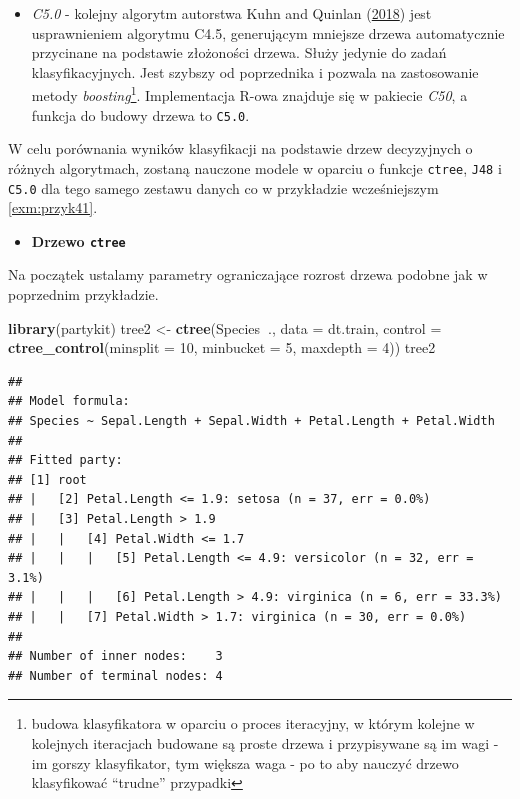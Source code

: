 \documentclass[]{book}
\newenvironment{Shaded}{\begin{snugshade}}{\end{snugshade}}
\newcommand{\DataTypeTok}[1]{\textcolor[rgb]{0.13,0.29,0.53}{#1}}
\newcommand{\DecValTok}[1]{\textcolor[rgb]{0.00,0.00,0.81}{#1}}
\newcommand{\KeywordTok}[1]{\textcolor[rgb]{0.13,0.29,0.53}{\textbf{#1}}}
\newcommand{\NormalTok}[1]{#1}
\newcommand{\OperatorTok}[1]{\textcolor[rgb]{0.81,0.36,0.00}{\textbf{#1}}}
\newcommand{\StringTok}[1]{\textcolor[rgb]{0.31,0.60,0.02}{#1}}
\providecommand{\tightlist}{%
  \setlength{\itemsep}{0pt}\setlength{\parskip}{0pt}}
\let\rmarkdownfootnote\footnote%
\def\footnote{\protect\rmarkdownfootnote}
\theoremstyle{plain}
\theoremstyle{definition}
\theoremstyle{definition}
\theoremstyle{definition}
\theoremstyle{definition}
\theoremstyle{remark}
\let\BeginKnitrBlock\begin \let\EndKnitrBlock\end
\begin{document}
\begin{itemize}
\item
  \emph{C5.0} - kolejny algorytm autorstwa Kuhn and Quinlan (\protect\hyperlink{ref-R-C50}{2018}) jest usprawnieniem algorytmu C4.5, generującym mniejsze drzewa automatycznie przycinane na podstawie złożoności drzewa. Służy jedynie do zadań klasyfikacyjnych. Jest szybszy od poprzednika i pozwala na zastosowanie metody \emph{boosting}\footnote{budowa klasyfikatora w oparciu o proces iteracyjny, w którym kolejne w kolejnych iteracjach budowane są proste drzewa i przypisywane są im wagi - im gorszy klasyfikator, tym większa waga - po to aby nauczyć drzewo klasyfikować ``trudne'' przypadki}. Implementacja R-owa znajduje się w pakiecie \emph{C50}, a funkcja do budowy drzewa to \texttt{C5.0}.
\end{itemize}

\BeginKnitrBlock{example}
\protect\hypertarget{exm:przyk42}{}{\label{exm:przyk42} }W celu porównania wyników klasyfikacji na podstawie drzew decyzyjnych o różnych algorytmach, zostaną nauczone modele w oparciu o funkcje \texttt{ctree}, \texttt{J48} i \texttt{C5.0} dla tego samego zestawu danych co w przykładzie wcześniejszym \ref{exm:przyk41}.
\EndKnitrBlock{example}

\begin{itemize}
\tightlist
\item
  \textbf{Drzewo \texttt{ctree}}
\end{itemize}

Na początek ustalamy parametry ograniczające rozrost drzewa podobne jak w poprzednim przykładzie.

\begin{Shaded}
\begin{Highlighting}[]
\KeywordTok{library}\NormalTok{(partykit)}
\NormalTok{tree2 <-}\StringTok{ }\KeywordTok{ctree}\NormalTok{(Species}\OperatorTok{~}\NormalTok{., }\DataTypeTok{data =}\NormalTok{ dt.train,}
               \DataTypeTok{control =} \KeywordTok{ctree_control}\NormalTok{(}\DataTypeTok{minsplit =} \DecValTok{10}\NormalTok{,}
                                       \DataTypeTok{minbucket =} \DecValTok{5}\NormalTok{,}
                                       \DataTypeTok{maxdepth =} \DecValTok{4}\NormalTok{))}
\NormalTok{tree2}
\end{Highlighting}
\end{Shaded}

\begin{verbatim}
## 
## Model formula:
## Species ~ Sepal.Length + Sepal.Width + Petal.Length + Petal.Width
## 
## Fitted party:
## [1] root
## |   [2] Petal.Length <= 1.9: setosa (n = 37, err = 0.0%)
## |   [3] Petal.Length > 1.9
## |   |   [4] Petal.Width <= 1.7
## |   |   |   [5] Petal.Length <= 4.9: versicolor (n = 32, err = 3.1%)
## |   |   |   [6] Petal.Length > 4.9: virginica (n = 6, err = 33.3%)
## |   |   [7] Petal.Width > 1.7: virginica (n = 30, err = 0.0%)
## 
## Number of inner nodes:    3
## Number of terminal nodes: 4
\end{verbatim}
\end{document}
